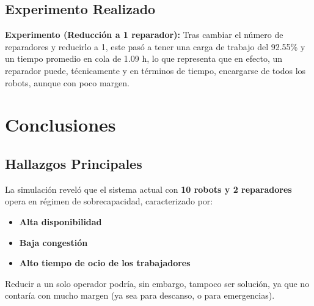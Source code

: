 \documentclass[12pt, a4paper]{article}
\begin{document}
\subsection{Experimento Realizado}

\textbf{Experimento (Reducción a 1 reparador):}
Tras cambiar el número de reparadores y reducirlo a 1, este pasó a tener una carga de trabajo del 92.55\% y un tiempo promedio en cola de 1.09 h, lo que representa que en efecto, un reparador puede, técnicamente y en términos de tiempo, encargarse de todos los robots, aunque con poco margen.\\

\section{Conclusiones}

\subsection{Hallazgos Principales}
La simulación reveló que el sistema actual con \textbf{10 robots y 2 reparadores} opera en régimen de sobrecapacidad, caracterizado por:
\begin{itemize}
    \item \textbf{Alta disponibilidad}
    \item \textbf{Baja congestión}
    \item \textbf{Alto tiempo de ocio de los trabajadores}
\end{itemize}

    Reducir a un solo operador podría, sin embargo, tampoco ser solución, ya que no contaría con mucho margen (ya sea para descanso, o para emergencias).

\begin{center}
\end{center}
\end{document}

